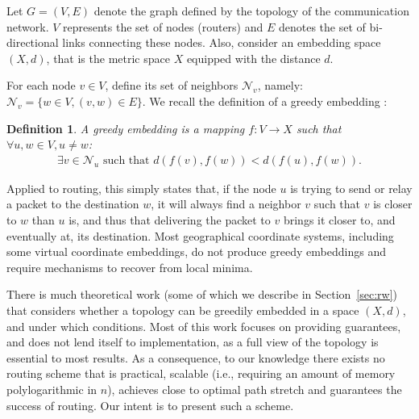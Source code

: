 \documentclass[conference]{IEEEtran}
\newtheorem{Definition}{Definition}[section]
\newcommand{\bDef}{ \begin{Definition} }
\newcommand{\eDef}{ \end{Definition} }
\def\cN{\mathcal{N}}
\begin{document}
Let $G = (V,E)$ denote the graph defined by the topology of the communication network. $V$ represents the set of nodes (routers) and $E$ denotes the set of bi-directional links connecting these nodes. Also, consider an embedding space $(X,d)$, that is the metric space $X$ equipped with the distance $d$.

For each node $v \in V$, define its set of neighbors $\cN_v$, namely: $\cN_v = \{w \in V, (v,w) \in E\}$. We recall the definition of a greedy embedding \cite{papadimitriou:conjecture}:

\bDef A greedy embedding is a mapping $f: V \rightarrow X$ such that $\forall u,w \in V, u \neq w$:
\begin{eqnarray}
\exists v \in \cN_u \mbox{ such that } d(f(v),f(w)) < d(f(u),f(w)).
\end{eqnarray}
\eDef
\vspace{0.2cm}
Applied to routing, this simply states that, if the node $u$ is trying to send or relay a packet to the destination $w$, it will always find a neighbor $v$ such that $v$ is closer to $w$ than $u$ is, and thus that delivering the packet to $v$ brings it closer to, and eventually at, its destination. Most geographical coordinate systems, including some virtual coordinate embeddings, 
do not produce greedy embeddings 
and require mechanisms to recover from local minima. 




There is much theoretical work (some of which we describe in Section~\ref{sec:rw}) that considers whether a topology can be greedily embedded in a space $(X,d)$, and under which conditions. Most of this work focuses on providing guarantees, and does not lend itself to implementation, as a full view of the topology is essential to most results.
As a consequence, to our knowledge there exists no routing scheme that is practical, scalable (i.e., requiring an amount of memory polylogarithmic in $n$), achieves close to optimal path stretch and guarantees the success of routing. Our intent is to present such a scheme.
\end{document}
